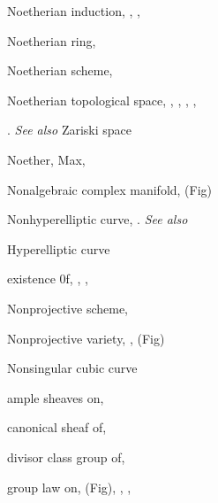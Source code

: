 {{\noindent\hspace*{0.0bp}Noetherian induction, , , \par
\noindent\hspace*{0.0bp}Noetherian ring, \par
\noindent\hspace*{0.0bp}Noetherian scheme, \par
\noindent\hspace*{0.0bp}Noetherian topological space, , , , ,\par
\noindent\hspace*{15.0bp}. \emph{See also} Zariski space\par
\noindent\hspace*{0.0bp}Noether, Max, \par
\noindent\hspace*{0.0bp}Nonalgebraic complex manifold,  (Fig)\par
\noindent\hspace*{0.0bp}Nonhyperelliptic curve, . \emph{See also}\par
\noindent\hspace*{15.0bp}Hyperelliptic curve\par
\noindent\hspace*{7.5bp}existence 0f, , , \par
\noindent\hspace*{0.0bp}Nonprojective scheme, \par
\noindent\hspace*{0.0bp}Nonprojective variety, ,  (Fig)\par
\noindent\hspace*{0.0bp}Nonsingular cubic curve\par
\noindent\hspace*{7.5bp}ample sheaves on, \par
\noindent\hspace*{7.5bp}canonical sheaf of, \par
\noindent\hspace*{7.5bp}divisor class group of, \par
\noindent\hspace*{7.5bp}group law on,  (Fig), , , \par
}}
